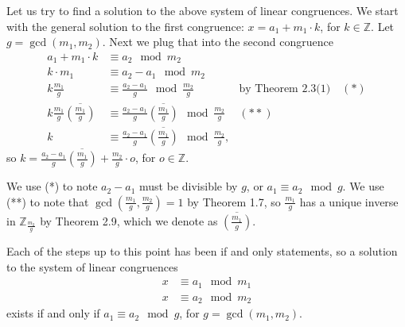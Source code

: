 \documentclass[12 pt]{amsart}
\begin{document}
  Let us try to find a solution to the above
  system of linear congruences.
  We start with the general solution to the first
  congruence:
  $x = a_1 + m_1 \cdot k$, 
  for $k \in \mathbb{Z}$.
  Let $g = \gcd(m_1, m_2)$.
  Next we plug that into the second congruence
  \begin{align*}
    a_1 + m_1 \cdot k &\equiv a_2 \mod m_2 \\
    k \cdot m_1 &\equiv a_2 - a_1 \mod m_2 \\
    k \frac{m_1}{g} &\equiv \frac{a_2 - a_1}{g} \mod \frac{m_2}{g} 
      & \text{by Theorem 2.3(1)} \quad (*)\\
    k \frac{m_1}{g} 
      \overline{\left( \frac{m_1}{g} \right)} 
      &\equiv 
      \frac{a_2 - a_1}{g} 
      \overline{\left( \frac{m_1}{g} \right)} 
      \mod \frac{m_2}{g} & (**) \\
    k &\equiv 
      \frac{a_2 - a_1}{g} 
      \overline{\left( \frac{m_1}{g} \right)} 
      \mod \frac{m_2}{g},
  \end{align*}
  so $k = \frac{a_2 - a_1}{g}  
          \overline{\left( \frac{m_1}{g} \right)}
          + \frac{m_2}{g} \cdot o$, 
  for $o \in \mathbb{Z}$.

  We use (*) to note $a_2 - a_1$ must be divisible by
  $g$, or $a_1 \equiv a_2 \mod g$. 
  We use (**) to note that 
  $\gcd \left( \frac{m_1}{g}, \frac{m_2}{g} \right) = 1$ by 
  Theorem 1.7, so $\frac{m_1}{g}$ has a unique inverse in 
  $\mathbb{Z}_{\frac{m_2}{g}}$ by Theorem 2.9, which we
  denote as $\overline{\left( \frac{m_1}{g} \right)}$.

  Each of the steps up to this point has been if and only
  statements, so a solution to the system of linear
  congruences 
  \begin{align*}
    x &\equiv a_1 \mod m_1 \\
    x &\equiv a_2 \mod m_2 
  \end{align*}
  exists if and only if $a_1 \equiv a_2 \mod g$, for 
  $g = \gcd(m_1, m_2)$. 
\end{document}
